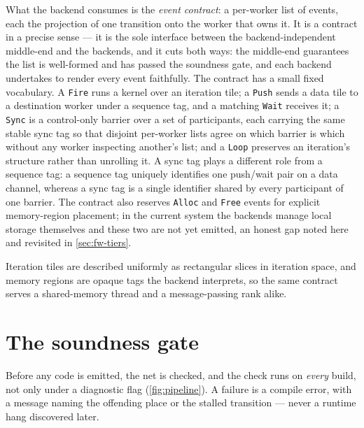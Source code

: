

What the backend consumes is the \emph{event contract}: a per-worker list of
events, each the projection of one transition onto the worker that owns it. It is
a contract in a precise sense --- it is the sole interface between the
backend-independent middle-end and the backends, and it cuts both ways: the
middle-end guarantees the list is well-formed and has passed the soundness gate,
and each backend undertakes to render every event faithfully. The contract has a
small fixed vocabulary. A \texttt{Fire} runs a kernel over an iteration tile; a
\texttt{Push} sends a data tile to a destination worker under a sequence tag, and
a matching \texttt{Wait} receives it; a \texttt{Sync} is a control-only barrier
over a set of participants, each carrying the same stable sync tag so that
disjoint per-worker lists agree on which barrier is which without any worker
inspecting another's list;
and a \texttt{Loop} preserves an iteration's structure rather than unrolling it. A
sync tag plays a different role from a sequence tag: a sequence tag uniquely
identifies one push/wait pair on a data channel, whereas a sync tag is a single
identifier shared by every participant of one barrier. The contract also reserves \texttt{Alloc} and \texttt{Free} events
for explicit memory-region placement; in the current system the backends manage
local storage themselves and these two are not yet emitted, an honest gap noted
here and revisited in \cref{sec:fw-tiers}.

Iteration tiles are described uniformly as rectangular slices in iteration space,
and memory regions are opaque tags the backend interprets, so the same contract
serves a shared-memory thread and a message-passing rank alike.



\section{The soundness gate}\label{sec:arch-gate}

Before any code is emitted, the net is checked, and the check runs on \emph{every}
build, not only under a diagnostic flag (\cref{fig:pipeline}). A failure is a
compile error, with a message naming the offending place or the stalled
transition --- never a runtime hang discovered later.

